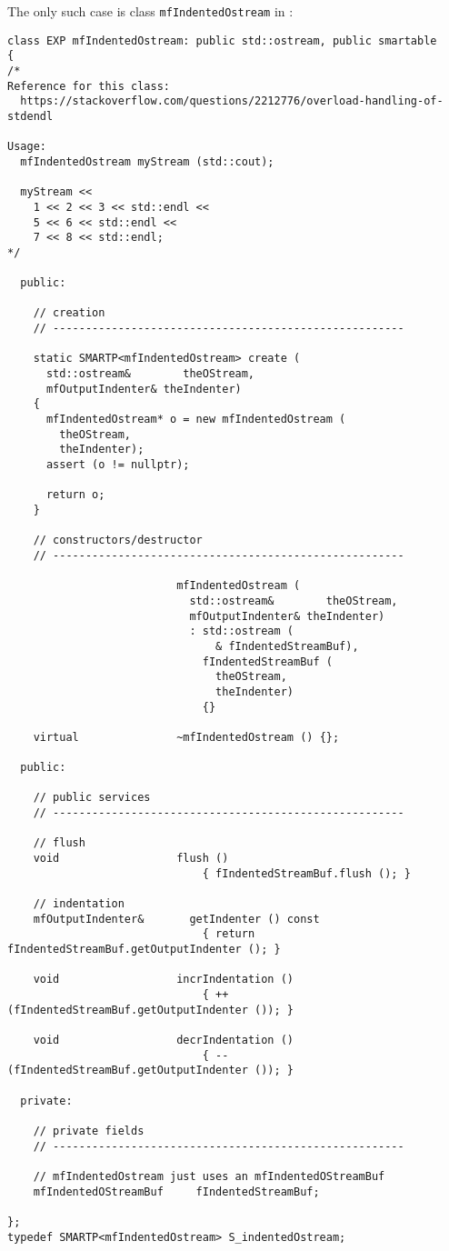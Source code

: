 The only such case is class   {\tt mfIndentedOstream} in :
\begin{lstlisting}[language=CPlusPlus]
class EXP mfIndentedOstream: public std::ostream, public smartable
{
/*
Reference for this class:
  https://stackoverflow.com/questions/2212776/overload-handling-of-stdendl

Usage:
  mfIndentedOstream myStream (std::cout);

  myStream <<
    1 << 2 << 3 << std::endl <<
    5 << 6 << std::endl <<
    7 << 8 << std::endl;
*/

  public:

    // creation
    // ------------------------------------------------------

    static SMARTP<mfIndentedOstream> create (
      std::ostream&        theOStream,
      mfOutputIndenter& theIndenter)
    {
      mfIndentedOstream* o = new mfIndentedOstream (
        theOStream,
        theIndenter);
      assert (o != nullptr);

      return o;
    }

    // constructors/destructor
    // ------------------------------------------------------

                          mfIndentedOstream (
                            std::ostream&        theOStream,
                            mfOutputIndenter& theIndenter)
                            : std::ostream (
                                & fIndentedStreamBuf),
                              fIndentedStreamBuf (
                                theOStream,
                                theIndenter)
                              {}

    virtual               ~mfIndentedOstream () {};

  public:

    // public services
    // ------------------------------------------------------

    // flush
    void                  flush ()
                              { fIndentedStreamBuf.flush (); }

    // indentation
    mfOutputIndenter&       getIndenter () const
                              { return fIndentedStreamBuf.getOutputIndenter (); }

    void                  incrIndentation ()
                              { ++ (fIndentedStreamBuf.getOutputIndenter ()); }

    void                  decrIndentation ()
                              { -- (fIndentedStreamBuf.getOutputIndenter ()); }

  private:

    // private fields
    // ------------------------------------------------------

    // mfIndentedOstream just uses an mfIndentedOStreamBuf
    mfIndentedOStreamBuf     fIndentedStreamBuf;

};
typedef SMARTP<mfIndentedOstream> S_indentedOstream;
\end{lstlisting}


